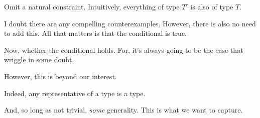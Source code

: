 \begin{note}
  Omit a natural constraint.
  Intuitively, everything of type \(T'\) is also of type \(T\).

  I doubt there are any compelling counterexamples.
  However, there is also no need to add this.
  All that matters is that the conditional is true.
\end{note}

\begin{note}
  Now, whether the conditional holds.
  For, it's always going to be the case that wriggle in some doubt.

  However, this is beyond our interest.

  Indeed, any representative of a type is a type.

  And, so long as not trivial, \emph{some} generality.
  This is what we want to capture.
\end{note}

\subsubsection{}
\label{sec:tr3}

